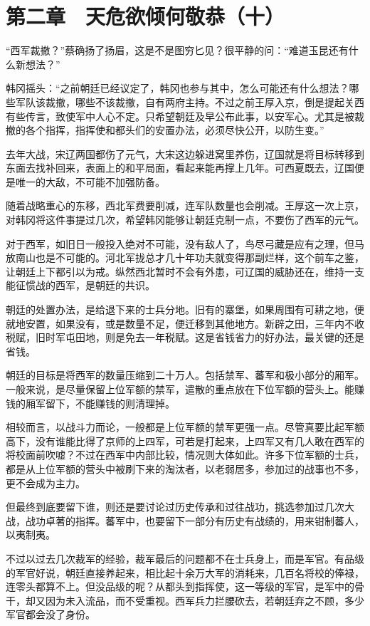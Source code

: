 \section{第二章　天危欲倾何敬恭（十）}

“西军裁撤？”蔡确扬了扬眉，这是不是图穷匕见？很平静的问：“难道玉昆还有什么新想法？”

韩冈摇头：“之前朝廷已经议定了，韩冈也参与其中，怎么可能还有什么想法？哪些军队该裁撤，哪些不该裁撤，自有两府主持。不过之前王厚入京，倒是提起关西有些传言，致使军中人心不定。只希望朝廷及早公布此事，以安军心。尤其是被裁撤的各个指挥，指挥使和都头们的安置办法，必须尽快公开，以防生变。”

去年大战，宋辽两国都伤了元气，大宋这边躲进窝里养伤，辽国就是将目标转移到东面去找补回来，表面上的和平局面，看起来能再撑上几年。可西夏既去，辽国便是唯一的大敌，不可能不加强防备。

随着战略重心的东移，西北军费要削减，连军队数量也会削减。王厚这一次上京，对韩冈将这件事提过几次，希望韩冈能够让朝廷克制一点，不要伤了西军的元气。

对于西军，如旧日一般投入绝对不可能，没有敌人了，鸟尽弓藏是应有之理，但马放南山也是不可能的。河北军拢总才几十年功夫就变得那副烂样，这个前车之鉴，让朝廷上下都引以为戒。纵然西北暂时不会有外患，可辽国的威胁还在，维持一支能征惯战的西军，是朝廷的共识。

朝廷的处置办法，是给退下来的士兵分地。旧有的寨堡，如果周围有可耕之地，便就地安置，如果没有，或是数量不足，便迁移到其他地方。新辟之田，三年内不收税赋，旧时军屯田地，则是免去一年税赋。这是省钱省力的好办法，最关键的还是省钱。

朝廷的目标是将西军的数量压缩到二十万人。包括禁军、蕃军和极小部分的厢军。一般来说，是尽量保留上位军额的禁军，遣散的重点放在下位军额的营头上。能赚钱的厢军留下，不能赚钱的则清理掉。

相较而言，以战斗力而论，一般都是上位军额的禁军更强一点。尽管真要比起军额高下，没有谁能比得了京师的上四军，可若是打起来，上四军又有几人敢在西军的将校面前吹嘘？不过在西军中内部比较，情况则大体如此。许多下位军额的士兵，都是从上位军额的营头中被刷下来的淘汰者，以老弱居多，参加过的战事也不多，更不会成为主力。

但最终到底要留下谁，则还是要讨论过历史传承和过往战功，挑选参加过几次大战，战功卓著的指挥。蕃军中，也要留下一部分有历史有战绩的，用来钳制蕃人，以夷制夷。

不过以过去几次裁军的经验，裁军最后的问题都不在士兵身上，而是军官。有品级的军官好说，朝廷直接养起来，相比起十余万大军的消耗来，几百名将校的俸禄，连零头都算不上。但没品级的呢？从都头到指挥使，这一等级的军官，是军中的骨干，却又因为未入流品，而不受重视。西军兵力拦腰砍去，若朝廷弃之不顾，多少军官都会没了身份。

